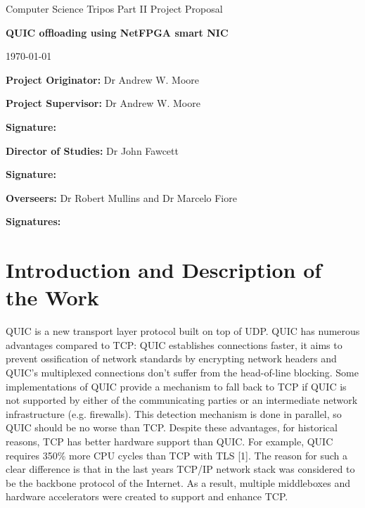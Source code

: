 \documentclass[a4paper,12pt]{article}
\begin{document}
\medskip
{}

\vfil

\centerline{\large Computer Science Tripos Part II Project Proposal}
\vspace{0.4in}
\centerline{\Large \textbf{QUIC offloading using NetFPGA smart NIC}}
\vspace{0.3in}
\centerline{\large \today}

\vfil

\textbf{Project Originator:} Dr Andrew W. Moore

\vspace{0.5in}

\textbf{Project Supervisor:} Dr Andrew W. Moore

\vspace{0.2in}

{\bf Signature:}

\vspace{0.5in}

{\bf Director of Studies:} Dr John Fawcett 

\vspace{0.2in}

{\bf Signature:}

\vspace{0.5in}

{\bf Overseers:} Dr Robert Mullins and Dr Marcelo Fiore

\vspace{0.2in}

{\bf Signatures:}

\vfil
\eject

\section*{Introduction and Description of the Work}
QUIC is a new transport layer protocol built on top of UDP.
QUIC has numerous advantages compared to TCP: 
QUIC establishes connections faster, 
it aims to prevent ossification of network standards by encrypting network headers 
and	QUIC's multiplexed connections don't suffer from the head-of-line blocking.
Some implementations of QUIC provide a mechanism to fall back to TCP if QUIC is not supported by either of the communicating parties or an intermediate network infrastructure (e.g. firewalls).
This detection mechanism is done in parallel, so QUIC should be no worse than TCP.
Despite these advantages, for historical reasons, TCP has better hardware support than QUIC.
For example, QUIC requires 350\% more CPU cycles than TCP with TLS [1].
The reason for such a clear difference is that in the last years TCP/IP network stack was considered to be the backbone protocol of the Internet.
As a result, multiple middleboxes and hardware accelerators were created to support and enhance TCP.
\end{document}
